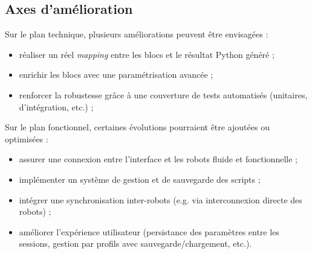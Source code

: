 \subsection{Axes d'amélioration} \label{sec:axes_amelioration}

Sur le plan technique, plusieurs améliorations peuvent être envisagées :
\begin{itemize}
    \item réaliser un réel \textit{mapping} entre les blocs et le résultat Python généré ;
    \item enrichir les blocs avec une paramétrisation avancée ;
    \item renforcer la robustesse grâce à une couverture de tests automatisés (unitaires, d’intégration, etc.) ;
\end{itemize}

Sur le plan fonctionnel, certaines évolutions pourraient être ajoutées ou optimisées :
\begin{itemize}
    \item assurer une connexion entre l'interface et les robots fluide et fonctionnelle ;
    \item implémenter un système de gestion et de sauvegarde des scripts ;
    \item intégrer une synchronisation inter-robots (e.g. via interconnexion directe des robots) ;
    \item améliorer l’expérience utilisateur (persistance des paramètres entre les sessions, gestion par profils avec sauvegarde/chargement, etc.).
\end{itemize}
